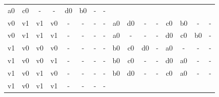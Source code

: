 \begin{table}[H]
{\begin{minipage}{\textwidth}
\begin{tabular}{cccccccccccccccc}
		\multicolumn{1}{|c}{a0} & \multicolumn{1}{c}{c0} & \multicolumn{1}{c}{-}& \multicolumn{1}{c}{-} &
		\multicolumn{1}{c}{d0} &
		\multicolumn{1}{c}{b0} &
		\multicolumn{1}{c}{-}&
		\multicolumn{1}{c}{-} \\
		\multicolumn{1}{c}{v0} & \multicolumn{1}{c}{v1} & \multicolumn{1}{c}{v1} & \multicolumn{1}{c}{v0} &
		\multicolumn{1}{c}{-} & \multicolumn{1}{c}{-} & \multicolumn{1}{c}{-} & \multicolumn{1}{c}{-} &
		\multicolumn{1}{|c}{a0} & \multicolumn{1}{c}{d0} & \multicolumn{1}{c}{-}& \multicolumn{1}{c}{-} &
		\multicolumn{1}{c}{c0} &
		\multicolumn{1}{c}{b0} &
		\multicolumn{1}{c}{-}&
		\multicolumn{1}{c}{-} \\
		\multicolumn{1}{c}{v0} & \multicolumn{1}{c}{v1} & \multicolumn{1}{c}{v1} & \multicolumn{1}{c}{v1} &
		\multicolumn{1}{c}{-} & \multicolumn{1}{c}{-} & \multicolumn{1}{c}{-} & \multicolumn{1}{c}{-} &
		\multicolumn{1}{|c}{a0} & \multicolumn{1}{c}{-} & \multicolumn{1}{c}{-}& \multicolumn{1}{c}{-} &
		\multicolumn{1}{c}{d0} &
		\multicolumn{1}{c}{c0} &
		\multicolumn{1}{c}{b0}&
		\multicolumn{1}{c}{-} \\
		\multicolumn{1}{c}{v1} & \multicolumn{1}{c}{v0} & \multicolumn{1}{c}{v0} & \multicolumn{1}{c}{v0} &
		\multicolumn{1}{c}{-} & \multicolumn{1}{c}{-} & \multicolumn{1}{c}{-} & \multicolumn{1}{c}{-} &
		\multicolumn{1}{|c}{b0} & \multicolumn{1}{c}{c0} & \multicolumn{1}{c}{d0}& \multicolumn{1}{c}{-} &
		\multicolumn{1}{c}{a0} &
		\multicolumn{1}{c}{-} &
		\multicolumn{1}{c}{-}&
		\multicolumn{1}{c}{-} \\
		\multicolumn{1}{c}{v1} & \multicolumn{1}{c}{v0} & \multicolumn{1}{c}{v0} & \multicolumn{1}{c}{v1} &
		\multicolumn{1}{c}{-} & \multicolumn{1}{c}{-} & \multicolumn{1}{c}{-} & \multicolumn{1}{c}{-} &
		\multicolumn{1}{|c}{b0} & \multicolumn{1}{c}{c0} & \multicolumn{1}{c}{-}& \multicolumn{1}{c}{-} &
		\multicolumn{1}{c}{d0} &
		\multicolumn{1}{c}{a0} &
		\multicolumn{1}{c}{-}&
		\multicolumn{1}{c}{-} \\
		\multicolumn{1}{c}{v1} & \multicolumn{1}{c}{v0} & \multicolumn{1}{c}{v1} & \multicolumn{1}{c}{v0} &
		\multicolumn{1}{c}{-} & \multicolumn{1}{c}{-} & \multicolumn{1}{c}{-} & \multicolumn{1}{c}{-} &
		\multicolumn{1}{|c}{b0} & \multicolumn{1}{c}{d0} & \multicolumn{1}{c}{-}& \multicolumn{1}{c}{-} &
		\multicolumn{1}{c}{c0} &
		\multicolumn{1}{c}{a0} &
		\multicolumn{1}{c}{-}&
		\multicolumn{1}{c}{-} \\
		\multicolumn{1}{c}{v1} & \multicolumn{1}{c}{v0} & \multicolumn{1}{c}{v1} & \multicolumn{1}{c}{v1} &
		\multicolumn{1}{c}{-} & \multicolumn{1}{c}{-} & \multicolumn{1}{c}{-} & \multicolumn{1}{c}{-} &

\end{tabular}
\end{minipage}}
\end{table}
